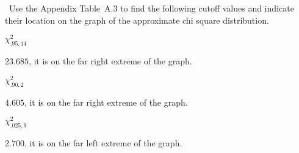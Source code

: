 \begin{problem}
  ~Use the Appendix Table~A.3 to find the following cutoff values and indicate their location on the graph of the approximate chi square distribution.
\end{problem}

\begin{subproblem}
  $\chi_{.95,14}^{2}$
\end{subproblem}

$\boxed{23.685}$, it is on the far right extreme of the graph.

\begin{subproblem}
  $\chi_{.90,2}^{2}$
\end{subproblem}

$\boxed{4.605}$, it is on the far right extreme of the graph.

\begin{subproblem}
  $\chi_{.025,9}^{2}$
\end{subproblem}

$\boxed{2.700}$, it is on the far left extreme of the graph.
